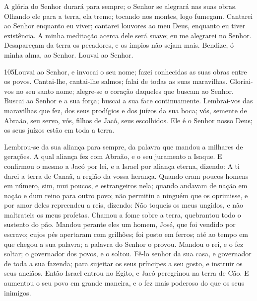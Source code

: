 A glória do Senhor durará para sempre; o Senhor se alegrará nas
suas obras. Olhando ele para a terra, ela treme; tocando nos
montes, logo fumegam. Cantarei ao Senhor enquanto eu viver;
cantarei louvores ao meu Deus, enquanto eu tiver existência.
A minha meditação acerca dele será suave; eu me alegrarei no
Senhor. Desapareçam da terra os pecadores, e os ímpios não
sejam mais. Bendize, ó minha alma, ao Senhor. Louvai ao Senhor.

\bigskip

\lettrine{105}{}Louvai ao Senhor, e invocai o seu nome; fazei
conhecidas as suas obras entre os povos. Cantai-lhe, cantai-lhe
salmos; falai de todas as suas maravilhas. Gloriai-vos no seu
santo nome; alegre-se o coração daqueles que buscam ao Senhor.
Buscai ao Senhor e a sua força; buscai a sua face continuamente.
Lembrai-vos das maravilhas que fez, dos seus prodígios e dos
juízos da sua boca; vós, semente de Abraão, seu servo, vós,
filhos de Jacó, seus escolhidos. Ele é o Senhor nosso Deus; os
seus juízos estão em toda a terra.

Lembrou-se da sua aliança para sempre, da palavra que mandou a
milhares de gerações. A qual aliança fez com Abraão, e o seu
juramento a Isaque. E confirmou o mesmo a Jacó por lei, e a
Israel por aliança eterna, dizendo: A ti darei a terra de
Canaã, a região da vossa herança. Quando eram poucos homens
em número, sim, mui poucos, e estrangeiros nela; quando
andavam de nação em nação e dum reino para outro povo; não
permitiu a ninguém que os oprimisse, e por amor deles repreendeu a
reis, dizendo: Não toqueis os meus ungidos, e não maltrateis
os meus profetas. Chamou a fome sobre a terra, quebrantou
todo o sustento do pão. Mandou perante eles um homem, José,
que foi vendido por escravo; cujos pés apertaram com
grilhões; foi posto em ferros; até ao tempo em que chegou a
sua palavra; a palavra do Senhor o provou. Mandou o rei, e o
fez soltar; o governador dos povos, e o soltou. Fê-lo senhor
da sua casa, e governador de toda a sua fazenda; para
sujeitar os seus príncipes a seu gosto, e instruir os seus anciãos.
Então Israel entrou no Egito, e Jacó peregrinou na terra de
Cão. E aumentou o seu povo em grande maneira, e o fez mais
poderoso do que os seus inimigos.

